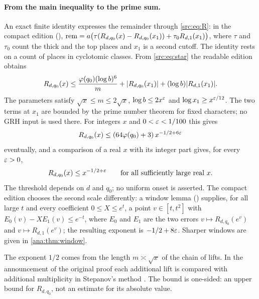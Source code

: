 \paragraph{From the main inequality to the prime sum.}
An exact finite identity expresses the remainder through \eqref{src:eq:R}: in the compact
edition (),
$\mathrm{rem}=a\bigl(\tau(R_{d,q_0}(x)-R_{d,q_0}(x_1))+\tau_0R_{d,1}(x_1)\bigr)$, where $\tau$ and
$\tau_0$ count the thick and the top places and $x_1$ is a second cutoff. The identity rests
on a count of places in cyclotomic classes. From \eqref{src:eq:star} the readable edition
obtains
\begin{equation}\label{src:eq:cutoffs}
R_{d,q_0}(x)\le\frac{\varphi(q_0)(\log b)^6}{m}+\lvert R_{d,q_0}(x_1)\rvert+(\log b)\lvert R_{d,1}(x_1)\rvert .
\end{equation}
The parameters satisfy $\sqrt x\le m\le2\sqrt x$, $\log b\le2x^{\varepsilon}$ and
$\log x_1\ge x^{\varepsilon/12}$. The two terms at $x_1$ are bounded by the prime number theorem for
fixed characters; no GRH input is used there. For integers $x$ and $0<\varepsilon<1/100$ this gives
\begin{equation}\label{src:eq:onesided-int}
R_{d,q_0}(x)\le(64\varphi(q_0)+3)\,x^{-1/2+6\varepsilon}
\end{equation}
eventually, and a comparison of a real $x$ with its integer part gives, for every $\varepsilon>0$,
\begin{equation}\label{src:eq:onesided}
R_{d,q_0}(x)\le x^{-1/2+\varepsilon}\qquad\text{for all sufficiently large real }x .
\end{equation}
The threshold depends on $d$ and $q_0$; no uniform onset is asserted. The compact edition
chooses the second scale differently: a window lemma
() supplies, for all large $t$ and every coefficient
$0\le X\le e^t$, a point $v\in[t,t^2]$ with $E_0(v)-XE_1(v)\le e^{-t}$, where $E_0$ and $E_1$
are the two errors $v\mapsto R_{d,q_0}(e^v)$ and $v\mapsto R_{d,1}(e^v)$; the resulting
exponent is $-1/2+8\varepsilon$. Sharper windows are given in \cref{ana:thm:window}.

The exponent $1/2$ comes from the length $m\asymp\sqrt x$ of the chain of lifts. In the
announcement of the original proof each additional lift is compared with additional
multiplicity in Stepanov's method \cite{Alpoge2026Remark}. The bound is one-sided: an upper
bound for $R_{d,q_0}$, not an estimate for its absolute value.

